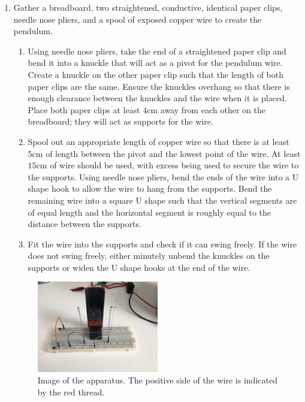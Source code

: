 \begin{enumerate}
	\item Gather a breadboard, two straightened, conductive, identical paper clips, needle nose pliers, and a spool of exposed copper wire to create the pendulum.
	\begin{enumerate}
		\item Using needle nose pliers, take the end of a straightened paper clip and bend it into a knuckle that will act as a pivot for the pendulum wire.
		Create a knuckle on the other paper clip such that the length of both paper clips are the same.
		Ensure the knuckles overhang so that there is enough clearance between the knuckles and the wire when it is placed.
		Place both paper clips at least $4\si{\centi\meter}$ away from each other on the breadboard; they will act as supports for the wire.
		\item Spool out an appropriate length of copper wire so that there is at least $5\si{\centi\meter}$ of length between the pivot and the lowest point of the wire.
		At least $15\si{\centi\meter}$ of wire should be used, with excess being used to secure the wire to the supports. 
		Using needle nose pliers, bend the ends of the wire into a U shape hook to allow the wire to hang from the supports.
		Bend the remaining wire into a square U shape such that the vertical segments are of equal length and the horizontal segment is roughly equal to the distance between the supports.
		\item Fit the wire into the supports and check if it can swing freely.
		If the wire does not swing freely, either minutely unbend the knuckles on the supports or widen the U shape hooks at the end of the wire.
	\end{enumerate}
	\begin{figure}[H]
		\centering
		\includegraphics[width=0.5\textwidth]{figures/IMG_5514.JPG}
		\caption{Image of the apparatus. The positive side of the wire is indicated by the red thread.}
		\label{fig:apparatus}
	\end{figure}

\end{enumerate}
